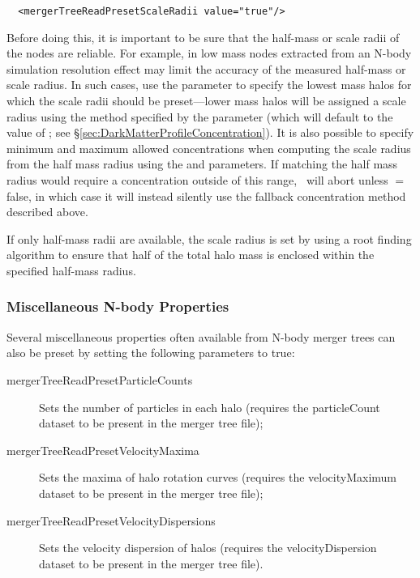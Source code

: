 \begin{verbatim}
  <mergerTreeReadPresetScaleRadii value="true"/>
\end{verbatim}

Before doing this, it is important to be sure that the half-mass or scale radii of the nodes are reliable. For example, in low mass nodes extracted from an N-body simulation resolution effect may limit the accuracy of the measured half-mass or scale radius. In such cases, use the {\normalfont \ttfamily [mergerTreeReadPresetScaleRadiiMinimumMass]} parameter to specify the lowest mass halos for which the scale radii should be preset---lower mass halos will be assigned a scale radius using the method specified by the {\normalfont \ttfamily [mergerTreeReadConcentrationFallbackMethod]} parameter (which will default to the value of {\normalfont \ttfamily [darkMatterConcentrationMethod]}; see \S\ref{sec:DarkMatterProfileConcentration}). It is also possible to specify minimum and maximum allowed concentrations when computing the scale radius from the half mass radius using the {\normalfont \ttfamily [mergerTreeReadPresetScaleRadiiConcentrationMinimum]} and {\normalfont \ttfamily [mergerTreeReadPresetScaleRadiiConcentrationMaximum]} parameters. If matching the half mass radius would require a concentration outside of this range, \glc\ will abort unless {\normalfont \ttfamily [mergerTreeReadPresetScaleRadiiFailureIsFatal]}$=${\normalfont \ttfamily false}, in which case it will instead silently use the fallback concentration method described above.

If only half-mass radii are available, the scale radius is set by using a root finding algorithm to ensure that half of the total halo mass is enclosed within the specified half-mass radius.

\subsubsection{Miscellaneous N-body Properties}

Several miscellaneous properties often available from N-body merger trees can also be preset by setting the following parameters to {\normalfont \ttfamily true}:
\begin{description}
\item[{mergerTreeReadPresetParticleCounts}] Sets the number of particles in each halo (requires the {\normalfont \ttfamily particleCount} dataset to be present in the merger tree file);
\item[{mergerTreeReadPresetVelocityMaxima}] Sets the maxima of halo rotation curves (requires the {\normalfont \ttfamily velocityMaximum} dataset to be present in the merger tree file);
\item[{mergerTreeReadPresetVelocityDispersions}] Sets the velocity dispersion of halos (requires the {\normalfont \ttfamily velocityDispersion} dataset to be present in the merger tree file).
\end{description}

